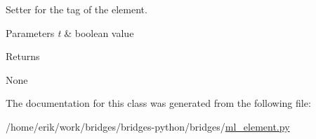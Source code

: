 Setter for the tag of the element. 


\begin{DoxyParams}{Parameters}
{\em t} & boolean value \\
\hline
\end{DoxyParams}
\begin{DoxyReturn}{Returns}


None 
\end{DoxyReturn}


The documentation for this class was generated from the following file\+:\begin{DoxyCompactItemize}
\item 
/home/erik/work/bridges/bridges-\/python/bridges/\hyperlink{ml__element_8py}{ml\+\_\+element.\+py}\end{DoxyCompactItemize}

